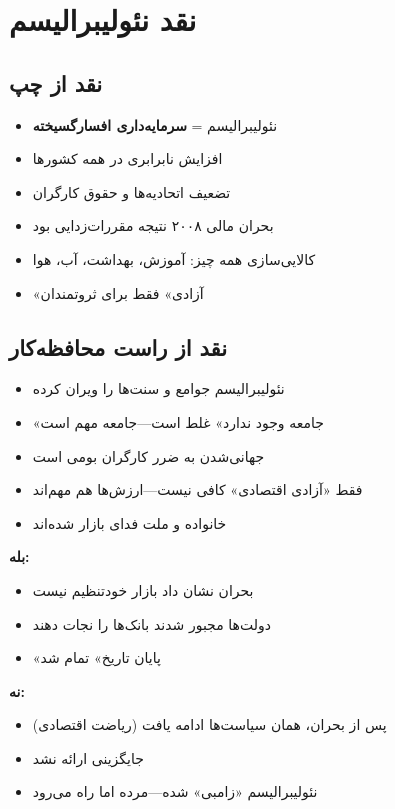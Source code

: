 \section{نقد نئولیبرالیسم}

\subsection{نقد از چپ}

\begin{itemize}[nosep, rightmargin=1.5cm]
    \item نئولیبرالیسم = \textbf{سرمایه‌داری افسارگسیخته}
    \item افزایش نابرابری در همه کشورها
    \item تضعیف اتحادیه‌ها و حقوق کارگران
    \item بحران مالی ۲۰۰۸ نتیجه مقررات‌زدایی بود
    \item کالایی‌سازی همه چیز: آموزش، بهداشت، آب، هوا
    \item «آزادی» فقط برای ثروتمندان
\end{itemize}

\subsection{نقد از راست محافظه‌کار}

\begin{itemize}[nosep, rightmargin=1.5cm]
    \item نئولیبرالیسم جوامع و سنت‌ها را ویران کرده
    \item «جامعه وجود ندارد» غلط است—جامعه مهم است
    \item جهانی‌شدن به ضرر کارگران بومی است
    \item فقط «آزادی اقتصادی» کافی نیست—ارزش‌ها هم مهم‌اند
    \item خانواده و ملت فدای بازار شده‌اند
\end{itemize}

\begin{debatebox}
\textbf{بله:}
\begin{itemize}[nosep]
    \item بحران نشان داد بازار خودتنظیم نیست
    \item دولت‌ها مجبور شدند بانک‌ها را نجات دهند
    \item «پایان تاریخ» تمام شد
\end{itemize}

\textbf{نه:}
\begin{itemize}[nosep]
    \item پس از بحران، همان سیاست‌ها ادامه یافت (ریاضت اقتصادی)
    \item جایگزینی ارائه نشد
    \item نئولیبرالیسم «زامبی» شده—مرده اما راه می‌رود
\end{itemize}
\end{debatebox}

